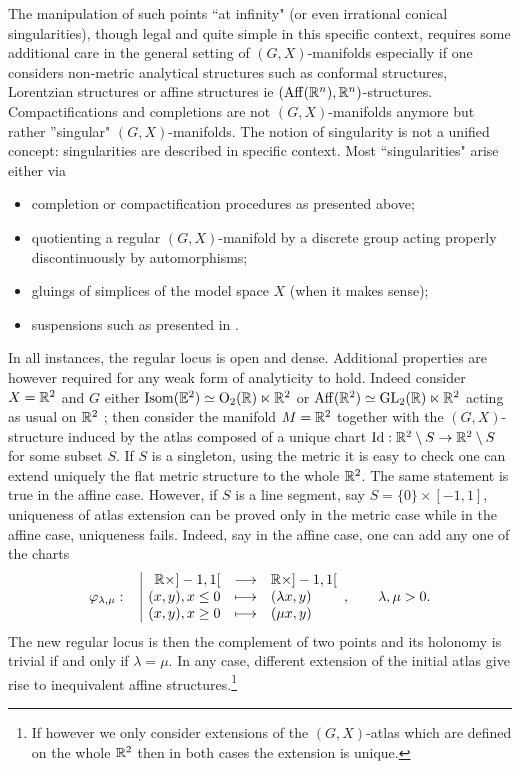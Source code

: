 The manipulation of such points ``at infinity" (or even irrational conical singularities), though legal and quite simple in this specific context, requires some additional care in the general setting of $(G,X)$-manifolds especially if one considers non-metric analytical structures such as conformal structures, Lorentzian structures or affine structures ie $(\mathrm{Aff}(\mathbb R^n),\mathbb R^n)$-structures. Compactifications and completions are not $(G,X)$-manifolds anymore but rather ''singular" $(G,X)$-manifolds. The notion of singularity is not a unified concept: singularities are described in specific context.
Most ``singularities" arise either via 
\begin{itemize}
 \item completion or compactification procedures as presented above;
 \item quotienting a regular $(G,X)$-manifold by a discrete group acting properly discontinuously by automorphisms;
 \item gluings of simplices of the model space $X$ (when it makes sense);
 \item suspensions such as presented in \cite{MR1668340,Particules_1}.
\end{itemize}


In all instances, the regular locus is open and dense. Additional properties are however required for any weak form of analyticity to hold. Indeed consider $X=\mathbb R^2$ and $G$ either $
\mathrm{Isom}(\mathbb E^2) \simeq\mathrm{O}_2(\mathbb R) \ltimes \mathbb R^2$ or $\mathrm{Aff}(\mathbb R^2)\simeq \mathrm{GL}_2(\mathbb R)\ltimes \mathbb R^2$ acting as usual on  $\mathbb R^2$ ; then consider the manifold $M = \mathbb R^2$ together with the $(G,X)$-structure induced by the atlas composed of a unique chart $\mathrm{Id} : \mathbb R^2\setminus S \rightarrow \mathbb R^2\setminus S$ for some subset $S$.  If $S$ is a singleton, using the metric it is easy to check one can extend uniquely the flat metric structure to the whole $\mathbb R^2$. The same statement is true in the affine case.
However, if $S$ is a  line segment, say  $S=\{0\}\times [-1,1]$, uniqueness of atlas extension can be proved only in the metric case while in the affine case, uniqueness fails. Indeed, say in the affine case, one can add any one  of  the charts
$$\displaystyle\varphi_{\lambda,\mu}:\begin{array}{l|rcl} & \displaystyle \mathbb R\times ]-1,1[ & \longrightarrow & \displaystyle \mathbb R\times ]-1,1[ \\ & \displaystyle (x,y),x\leq 0 & \longmapsto & \displaystyle (\lambda x,y) \\ & \displaystyle (x,y),x\geq 0 & \longmapsto & \displaystyle (\mu x,y)\end{array},\quad \quad \lambda,\mu>0.$$
The new regular locus is then the complement of two points and its holonomy is trivial if and only if $\lambda=\mu$. In any case, different extension of the initial atlas give rise to inequivalent affine structures.\footnote{If however we only consider extensions of the $(G,X)$-atlas which are defined on the whole $\mathbb R^2$ then in both cases the extension is unique.} 
